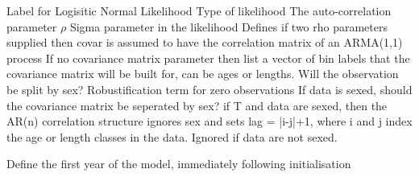 \par\par
\par\textbf{}\par
\par\textbf{}\par
\par\textbf{}\par
\par\textbf{}\par
\par\textbf{}\par
\par\textbf{}\par
{} {Label for Logisitic Normal Likelihood}
 {Type of likelihood}
 {The auto-correlation parameter $\rho$}
 {Sigma parameter in the likelihood}
 {Defines if two rho parameters supplied then covar is assumed to have the correlation matrix of an ARMA(1,1) process}
 {If no covariance matrix parameter then list a vector of bin labels that the covariance matrix will be built for, can be ages or lengths.}
 {Will the observation be split by sex?}
 {Robustification term for zero observations}
 {If data is sexed, should the covariance matrix be seperated by sex?}
 {if T and data are sexed, then the AR(n) correlation structure ignores sex and sets lag = |i-j|+1, where i and j index the age or length classes in the data.  Ignored if data are not sexed.}
\par\textbf{}\par
\par\textbf{}\par
\par\textbf{}\par
{}\par\par
{} {Define the first year of the model, immediately following initialisation}
